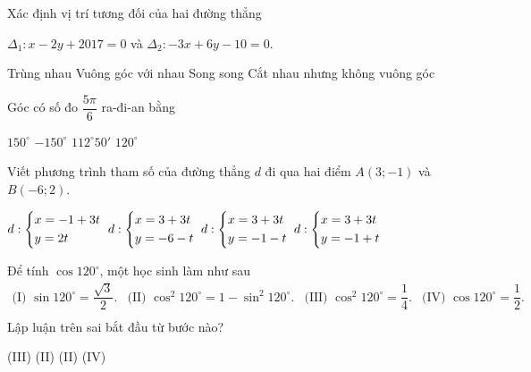 \begin{ex}%
Xác định vị trí tương đối của hai đường thẳng\\
\centerline{$\Delta_1: x-2y+2017 = 0$ và $\Delta_2: -3x+6y-10 = 0$.}

	\choice
{Trùng nhau}
{Vuông góc với nhau}
{\True Song song}
{Cắt nhau nhưng không vuông góc}
\end{ex}

\begin{ex}%
Góc có số đo $\dfrac{5\pi}{6}$ ra-đi-an bằng

	\choice
{\True $150^\circ$}
{$-150^\circ$}
{$112^\circ50'$}
{$120^\circ$}
\end{ex}

\begin{ex}%
Viết phương trình tham số của đường thẳng $d$ đi qua hai điểm $A(3;-1)$ và $B(-6;2)$.

	\choice
{$d:\left\{\begin{aligned}& x = -1+3t \\ & y = 2t\end{aligned}\right.$}
{$d:\left\{\begin{aligned}& x = 3+3t \\ & y = -6-t\end{aligned}\right.$}
{\True $d:\left\{\begin{aligned}& x = 3+3t \\ & y = -1-t\end{aligned}\right.$}
{$d:\left\{\begin{aligned}& x = 3+3t \\ & y = -1+t\end{aligned}\right.$}
\end{ex}

\begin{ex}%
Để tính $\cos 120^\circ$, một học sinh làm như sau\\
$
\begin{array}{cccc}
\text{(I) } \sin 120^\circ = \dfrac{\sqrt{3}}{2}.& \text{(II) } \cos^2 120^\circ = 1 -  \sin^2 120^\circ.  & \text{(III) } \cos^2 120^\circ = \dfrac{1}{4}.  &  \text{(IV) } \cos 120^\circ = \dfrac{1}{2}.  \\
\end{array}
$ \\
Lập luận trên sai bắt đầu từ bước nào?

	\choice
{(III)}
{(II)}
{(II)}
{\True (IV)}
\end{ex}

